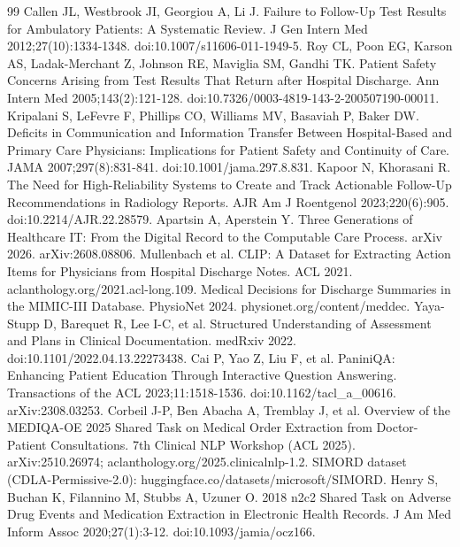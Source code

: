 \documentclass[3p,twocolumn]{elsarticle}
\begin{document}
\begin{thebibliography}{99}
\setlength{\itemsep}{2pt plus 0.5pt}\setlength{\parsep}{0pt}
\label{r1} Callen JL, Westbrook JI, Georgiou A, Li J. Failure to Follow-Up Test Results for Ambulatory Patients: A Systematic Review. J Gen Intern Med 2012;27(10):1334-1348. doi:10.1007/s11606-011-1949-5.
\label{r2} Roy CL, Poon EG, Karson AS, Ladak-Merchant Z, Johnson RE, Maviglia SM, Gandhi TK. Patient Safety Concerns Arising from Test Results That Return after Hospital Discharge. Ann Intern Med 2005;143(2):121-128. doi:10.7326/0003-4819-143-2-200507190-00011.
\label{r3} Kripalani S, LeFevre F, Phillips CO, Williams MV, Basaviah P, Baker DW. Deficits in Communication and Information Transfer Between Hospital-Based and Primary Care Physicians: Implications for Patient Safety and Continuity of Care. JAMA 2007;297(8):831-841. doi:10.1001/jama.297.8.831.
\label{r4} Kapoor N, Khorasani R. The Need for High-Reliability Systems to Create and Track Actionable Follow-Up Recommendations in Radiology Reports. AJR Am J Roentgenol 2023;220(6):905. doi:10.2214/AJR.22.28579.
\label{r5} Apartsin A, Aperstein Y. Three Generations of Healthcare IT: From the Digital Record to the Computable Care Process. arXiv 2026. arXiv:2608.08806.
\label{r6} Mullenbach et al. CLIP: A Dataset for Extracting Action Items for Physicians from Hospital Discharge Notes. ACL 2021. aclanthology.org/2021.acl-long.109.
\label{r7} Medical Decisions for Discharge Summaries in the MIMIC-III Database. PhysioNet 2024. physionet.org/content/meddec.
\label{r8} Yaya-Stupp D, Barequet R, Lee I-C, et al. Structured Understanding of Assessment and Plans in Clinical Documentation. medRxiv 2022. doi:10.1101/2022.04.13.22273438.
\label{r9} Cai P, Yao Z, Liu F, et al. PaniniQA: Enhancing Patient Education Through Interactive Question Answering. Transactions of the ACL 2023;11:1518-1536. doi:10.1162/tacl\_a\_00616. arXiv:2308.03253.
\label{r10} Corbeil J-P, Ben Abacha A, Tremblay J, et al. Overview of the MEDIQA-OE 2025 Shared Task on Medical Order Extraction from Doctor-Patient Consultations. 7th Clinical NLP Workshop (ACL 2025). arXiv:2510.26974; aclanthology.org/2025.clinicalnlp-1.2. SIMORD dataset (CDLA-Permissive-2.0): huggingface.co/datasets/microsoft/SIMORD.
\label{r11} Henry S, Buchan K, Filannino M, Stubbs A, Uzuner O. 2018 n2c2 Shared Task on Adverse Drug Events and Medication Extraction in Electronic Health Records. J Am Med Inform Assoc 2020;27(1):3-12. doi:10.1093/jamia/ocz166.

\end{thebibliography}
\end{document}
